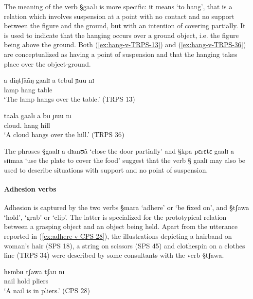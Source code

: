 The meaning of the verb {\S gaalɪ} is more specific: it means `to hang',  that
is a relation which involves suspension at a point with no contact and no
support between the figure and the ground,  but with an intention of covering
partially. It is used to indicate that the hanging occurs over a ground object,
i.e. the figure being above the ground.  Both   (\ref{ex:hang-v-TRPS-13}) and
(\ref{ex:hang-v-TRPS-36}) are conceptualized as having a point of suspension and
that the hanging takes place over the object-ground.

\begin{exe}
\ex\label{ex:hang-v}
 \begin{xlist}
  \ex\label{ex:hang-v-TRPS-13}
\gll a diŋtʃããŋ gaalɪ a tebul ɲuu nɪ  \\
{\art} lamp hang {\art} table {\reln}  {\postp} \\
\glt `The lamp hangs over the table.' (TRPS 13)

 \ex\label{ex:hang-v-TRPS-36}
\gll taala gaalɪ  a bɪɪ ɲuu nɪ \\
 cloud.{\pl}   hang  {\art} hill {\reln} {\postp} \\
\glt `A cloud hangs over the hill.' (TRPS 36)%
 \end{xlist}
\end{exe}


The phrases {\S gaalɪ a dɪanʊã} `close the door partially' and {\S kpa pɛrɛtɛ
gaalɪ a sɪɪmaa} `use the plate to cover the food'   suggest that the verb {\S
gaalɪ} may also be used to describe situations with support and no point of
suspension. 



\paragraph{Adhesion verbs}
\label{sec:SPA-adhesion-v}

Adhesion is captured by the two verbs {\S mara}  `adhere' or `be fixed on',  and
{\S tʃawa} `hold', `grab' or `clip'. The latter is specialized for the
prototypical relation  between a grasping object and an object
being held.  Apart from the utterance reported in (\ref{ex:adhere-v-CPS-28}),
the illustrations depicting a hairband on woman’s hair (SPS 18),  a string
on scissors (SPS 45) and  clothespin  on a  clothes line   (TRPS 34)
were described by some consultants with the verb {\S tʃawa}.


\begin{exe}
  \ex\label{ex:adhere-v-CPS-28}
\gll hɛmbɪɪ tʃawa tʃau nɪ  \\
 nail hold pliers {\postp}\\
\glt `A nail is in pliers.' (CPS 28)
\end{exe}

